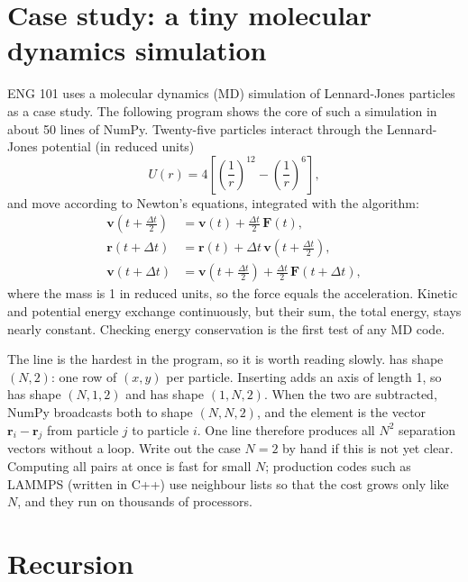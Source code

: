 \section{Case study: a tiny molecular dynamics simulation}

ENG 101 uses a molecular dynamics (MD) simulation of Lennard-Jones particles as a case
study. The following program shows the core of such a simulation in about 50 lines of
NumPy. Twenty-five particles interact through the Lennard-Jones potential (in reduced units)
\[
U(r) = 4\left[\left(\frac{1}{r}\right)^{12} - \left(\frac{1}{r}\right)^{6}\right],
\]
and move according to Newton's equations, integrated with the 
algorithm:
\begin{align*}
\mathbf{v}\!\left(t+\tfrac{\Delta t}{2}\right) &= \mathbf{v}(t) + \tfrac{\Delta t}{2}\,\mathbf{F}(t),\\
\mathbf{r}(t+\Delta t) &= \mathbf{r}(t) + \Delta t\, \mathbf{v}\!\left(t+\tfrac{\Delta t}{2}\right),\\
\mathbf{v}(t+\Delta t) &= \mathbf{v}\!\left(t+\tfrac{\Delta t}{2}\right) + \tfrac{\Delta t}{2}\,\mathbf{F}(t+\Delta t),
\end{align*}
where the mass is 1 in reduced units, so the force equals the acceleration.
Kinetic and potential energy exchange continuously, but their sum, the total energy, stays
nearly constant. Checking energy conservation is the first test of any MD code. 

The line  is the hardest in the program, so
it is worth reading slowly.  has shape $(N, 2)$: one row of $(x, y)$ per
particle. Inserting  adds an axis of length 1, so  has
shape $(N, 1, 2)$ and  has shape $(1, N, 2)$. When the two are
subtracted, NumPy broadcasts both to shape $(N, N, 2)$, and the element  is
the vector $\mathbf{r}_i - \mathbf{r}_j$ from particle $j$ to particle $i$. One line
therefore produces all $N^2$ separation vectors without a loop. Write out the case $N = 2$
by hand if this is not yet clear. Computing all pairs at once is fast for small $N$; production codes such as LAMMPS (written in C++) use neighbour lists so that
the cost grows only like $N$, and they run on thousands of processors.

\section{Recursion}

